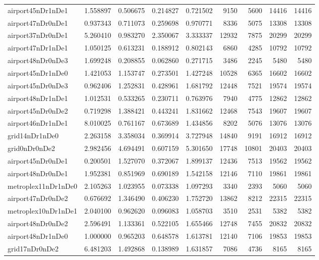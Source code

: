 \begin{longtable}{|l|r|r|r|r|r|r|r|r|}
airport45nDr1nDe1 & 1.558897 & 0.506675 & 0.214827 & 0.721502 & 9150 & 5600 & 14416 & 14416 \\
airport47nDr0nDe1 & 0.937343 & 0.711073 & 0.259698 & 0.970771 & 8336 & 5075 & 13308 & 13308 \\
airport37nDr0nDe1 & 5.260410 & 0.983270 & 2.350067 & 3.333337 & 12932 & 7875 & 20299 & 20299 \\
airport47nDr1nDe1 & 1.050125 & 0.613231 & 0.188912 & 0.802143 & 6860 & 4285 & 10792 & 10792 \\
airport48nDr0nDe3 & 1.699248 & 0.208855 & 0.062860 & 0.271715 & 3486 & 2245 & 5480 & 5480 \\
airport45nDr1nDe0 & 1.421053 & 1.153747 & 0.273501 & 1.427248 & 10528 & 6365 & 16602 & 16602 \\
airport45nDr0nDe3 & 0.962406 & 1.252831 & 0.428961 & 1.681792 & 12448 & 7521 & 19574 & 19574 \\
airport48nDr1nDe1 & 1.012531 & 0.533265 & 0.230711 & 0.763976 & 7940 & 4775 & 12862 & 12862 \\
airport45nDr0nDe2 & 0.719298 & 1.388421 & 0.443241 & 1.831662 & 12468 & 7543 & 19607 & 19607 \\
airport46nDr1nDe1 & 8.010025 & 0.761167 & 0.673689 & 1.434856 & 8202 & 5076 & 13076 & 13076 \\
grid14nDr1nDe0 & 2.263158 & 3.358034 & 0.369914 & 3.727948 & 14840 & 9191 & 16912 & 16912 \\
grid0nDr0nDe2 & 2.982456 & 4.694491 & 0.607159 & 5.301650 & 17748 & 10801 & 20403 & 20403 \\
airport45nDr0nDe1 & 0.200501 & 1.527070 & 0.372067 & 1.899137 & 12436 & 7513 & 19562 & 19562 \\
airport48nDr0nDe1 & 1.952381 & 0.851969 & 0.690189 & 1.542158 & 12146 & 7110 & 19861 & 19861 \\
metroplex11nDr1nDe0 & 2.105263 & 1.023955 & 0.073338 & 1.097293 & 3340 & 2393 & 5060 & 5060 \\
airport47nDr0nDe2 & 0.676692 & 1.346490 & 0.406230 & 1.752720 & 13862 & 8212 & 22315 & 22315 \\
metroplex10nDr1nDe1 & 2.040100 & 0.962620 & 0.096083 & 1.058703 & 3510 & 2531 & 5382 & 5382 \\
airport48nDr0nDe2 & 2.596491 & 1.133361 & 0.522105 & 1.655466 & 12748 & 7455 & 20832 & 20832 \\
airport48nDr1nDe0 & 1.000000 & 0.965203 & 0.648578 & 1.613781 & 12140 & 7106 & 19853 & 19853 \\
grid17nDr0nDe2 & 6.481203 & 1.492868 & 0.138989 & 1.631857 & 7086 & 4736 & 8165 & 8165 \\

\end{longtable}
